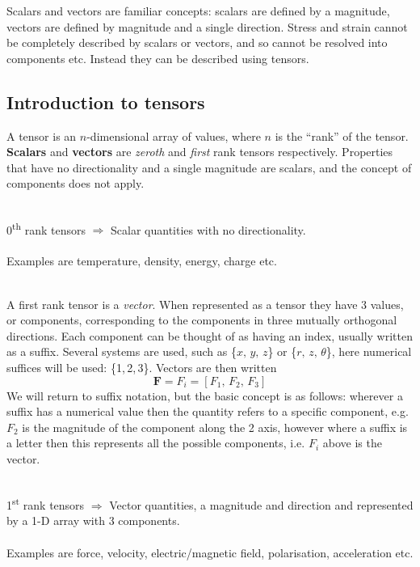 Scalars and vectors are familiar concepts: scalars are defined by a magnitude, vectors are defined by magnitude and a single direction. Stress and strain cannot be completely described by scalars or vectors, and so cannot be resolved into components etc. Instead they can be described using tensors.


\subsection{Introduction to tensors}

A tensor is an $n$-dimensional array of values, where $n$ is the ``rank'' of the tensor. {\bf Scalars} and {\bf vectors} are \emph{zeroth} and \emph{first} rank tensors respectively. Properties that have no directionality and a single magnitude are scalars, and the concept of components does not apply.
\\
\\
\begin{annotation}
0\textsuperscript{th} rank tensors $\Longrightarrow$ Scalar quantities with no directionality.
\\
\\
Examples are temperature, density, energy, charge etc.
\end{annotation}
\\

A first rank tensor is a \emph{vector}. When represented as a tensor they have 3 values, or components, corresponding to the components in three mutually orthogonal directions. Each component can be thought of as having an index, usually written as a suffix. Several systems are used, such as \{$x,\,y,\,z$\} or \{$r,\,z,\,\theta$\}, here numerical suffices will be used: \{1,\,2,\,3\}. Vectors are then written
\begin{equation}
\mathbf{F} = F_i = [F_1,\, F_2,\, F_3]
\end{equation}
We will return to suffix notation, but the basic concept is as follows: wherever a suffix has a numerical value then the quantity refers to a specific component, e.g. $F_2$ is the magnitude of the component along the 2 axis, however where a suffix is a letter then this represents all the possible components, i.e. $F_i$ above is the  vector.
\\
\\
\begin{annotation}
1\textsuperscript{st} rank tensors $\Longrightarrow$ Vector quantities, a magnitude and direction and represented by a 1-D array with 3 components.
\\
\\
Examples are force, velocity, electric/magnetic field, polarisation, acceleration etc.
\end{annotation}


